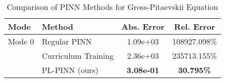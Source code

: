\begin{table}[htbp]
\centering
\caption{Comparison of PINN Methods for Gross-Pitaevskii Equation}
\label{tab:pinn_comparison}
\begin{tabular}{llcc}
\toprule
Mode & Method & Abs. Error & Rel. Error \\
\midrule
Mode 0 & Regular PINN & 1.09e+03 & 108927.098\% \\
 & Curriculum Training & 2.36e+03 & 235713.155\% \\
 & PL-PINN (ours) & \textbf{3.08e-01} & \textbf{30.795\%} \\
\bottomrule
\end{tabular}
\end{table}